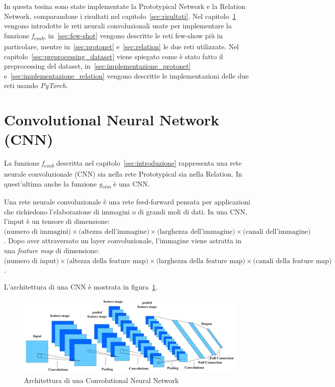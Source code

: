 \documentclass[12pt,a4paper,titlepage]{article}
\begin{document}
In questa tesina sono state implementate la Prototypical Network e la Relation Network, comparandone i risultati nel capitolo~\ref{sec:risultati}. Nel capitolo~\ref{sec:cnn} vengono introdotte le reti neurali convoluzionali usate per implementare la funzione \textit{f\textsubscript{emb}}, in~\ref{sec:few-shot} vengono descritte le reti few-show più in particolare, mentre in~\ref{sec:protonet} e~\ref{sec:relation} le due reti utilizzate. Nel capitolo~\ref{sec:preprocessing_dataset} viene spiegato come è stato fatto il preprocessing del dataset, in~\ref{sec:implementazione_protonet} e~\ref{sec:implementazione_relation} vengono descritte le implementazioni delle due reti usando \textit{PyTorch}.

\clearpage

\section{Convolutional Neural Network (CNN)}
\label{sec:cnn}
La funzione \textit{f\textsubscript{emb}} descritta nel capitolo~\ref{sec:introduzione} rappresenta una rete neurale convoluzionale (CNN) sia nella rete Prototypical sia nella Relation. In quest'ultima anche la funzione \textit{g\textsubscript{sim}} è una CNN.

Una rete neurale convoluzionale è una rete feed-forward pensata per applicazioni che richiedono l'elaborazione di immagini o di grandi moli di dati.
In una CNN, l'input è un tensore di dimensione: $\text{(numero di immagini)} \times \text{(altezza dell'immagine)} \times \text{(larghezza dell'immagine)} \times \text{(canali dell'immagine)}$. Dopo aver attraversato un layer convoluzionale, l'immagine viene astratta in una \textit{feature map} di dimensione: $\text{(numero di input)} \times \text{(altezza della feature map)} \times \text{(larghezza della feature map)} \times \text{(canali della feature map)}$. 

L'architettura di una CNN è mostrata in figura~\ref{fig:cnn}.
\begin{figure}[h]
	\centering	
	\includegraphics[width=1\textwidth]{Immagini/cnn}
	\caption{Architettura di una Convolutional Neural Network}
	\label{fig:cnn}
\end{figure}
\end{document}

